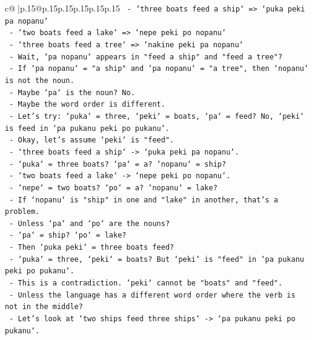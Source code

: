 \documentclass{article}
\begin{document}
{\begin{supertabular}{c@{$\;$}|p{.15\linewidth}@{}p{.15\linewidth}p{.15\linewidth}p{.15\linewidth}p{.15\linewidth}p{.15\linewidth}}
{{{\texttt{                {-} `three boats feed a ship` => `puka peki pa nopanu`} \\
\texttt{                {-} `two boats feed a lake` => `nepe peki po nopanu`} \\
\texttt{                {-} `three boats feed a tree` => `nakine peki pa nopanu`} \\
\texttt{                {-} Wait, `pa nopanu` appears in "feed a ship" and "feed a tree"?} \\
\texttt{                {-} If `pa nopanu` = "a ship" and `pa nopanu` = "a tree", then `nopanu` is not the noun.} \\
\texttt{                {-} Maybe `pa` is the noun? No.} \\
\texttt{                {-} Maybe the word order is different.} \\
\texttt{                {-} Let's try: `puka` = three, `peki` = boats, `pa` = feed? No, `peki` is feed in `pa pukanu peki po pukanu`.} \\
\texttt{                {-} Okay, let's assume `peki` is "feed".} \\
\texttt{                {-} `three boats feed a ship` {-}> `puka peki pa nopanu`.} \\
\texttt{                  {-} `puka` = three boats? `pa` = a? `nopanu` = ship?} \\
\texttt{                {-} `two boats feed a lake` {-}> `nepe peki po nopanu`.} \\
\texttt{                  {-} `nepe` = two boats? `po` = a? `nopanu` = lake?} \\
\texttt{                  {-} If `nopanu` is "ship" in one and "lake" in another, that's a problem.} \\
\texttt{                  {-} Unless `pa` and `po` are the nouns?} \\
\texttt{                  {-} `pa` = ship? `po` = lake?} \\
\texttt{                  {-} Then `puka peki` = three boats feed?} \\
\texttt{                  {-} `puka` = three, `peki` = boats? But `peki` is "feed" in `pa pukanu peki po pukanu`.} \\
\texttt{                  {-} This is a contradiction. `peki` cannot be "boats" and "feed".} \\
\texttt{                  {-} Unless the language has a different word order where the verb is not in the middle?} \\
\texttt{                  {-} Let's look at `two ships feed three ships` {-}> `pa pukanu peki po pukanu`.} \\
}}}
\end{supertabular}}
\end{document}

